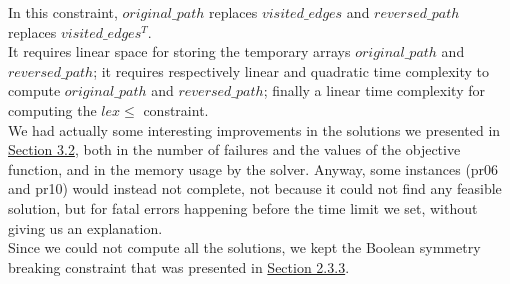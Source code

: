\documentclass[../main.tex]{subfiles}
\begin{document}
In this constraint, $original\_path$ replaces $visited\_edges$ and $reversed\_path$ replaces $visited\_edges^T$.\\
It requires linear space for storing the temporary arrays $original\_path$ and $reversed\_path$; it requires respectively linear and quadratic time complexity to compute $original\_path$ and $reversed\_path$; finally a linear time complexity for computing the $lex\leq$ constraint.\\
We had actually some interesting improvements in the solutions we presented in \hyperref[subsec:experimental-results]{Section 3.2}, both in the number of failures and the values of the objective function, and in the memory usage by the solver.
Anyway, some instances (pr06 and pr10) would instead not complete, not because it could not find any feasible solution, but for fatal errors happening before the time limit we set, without giving us an explanation.\\
Since we could not compute all the solutions, we kept the Boolean symmetry breaking constraint that was presented in \hyperref[subsubsec:symmetry-breaking-constraints]{Section 2.3.3}. 
\end{document}
